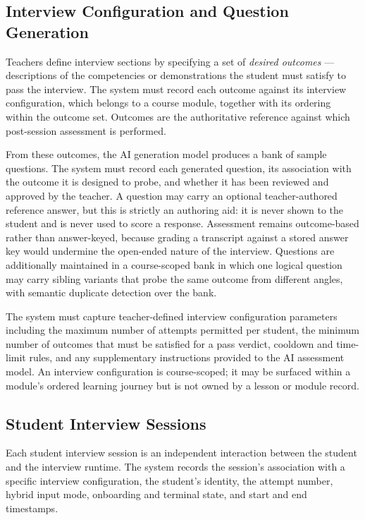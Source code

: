 \subsection{Interview Configuration and Question Generation}
Teachers define interview sections by specifying a set of 
\textit{desired outcomes} — descriptions of the competencies or 
demonstrations the student must satisfy to pass the interview. The 
system must record each outcome against its interview configuration,
which belongs to a course module, together with its ordering within the
outcome set. Outcomes are the authoritative reference against which
post-session assessment is performed.

From these outcomes, the AI generation model produces a bank of sample 
questions. The system must record each generated question, its 
association with the outcome it is designed to probe, and whether it 
has been reviewed and approved by the teacher. A question may carry an
optional teacher-authored reference answer, but this is strictly an
authoring aid: it is never shown to the student and is never used to
score a response. Assessment remains outcome-based rather than
answer-keyed, because grading a transcript against a stored answer key
would undermine the open-ended nature of the interview. Questions are
additionally maintained in a course-scoped bank in which one logical
question may carry sibling variants that probe the same outcome from
different angles, with semantic duplicate detection over the bank.

The system must capture teacher-defined interview configuration
parameters including the maximum number of attempts permitted per
student, the minimum number of outcomes that must be satisfied for a
pass verdict, cooldown and time-limit rules, and any supplementary
instructions provided to the AI assessment model. An interview configuration is course-scoped; it may be surfaced within a module's ordered learning journey but is not owned by a lesson or module record.

\subsection{Student Interview Sessions}
Each student interview session is an independent interaction between
the student and the interview runtime. The system records the session's
association with a specific interview configuration, the student's
identity, the attempt number, hybrid input mode, onboarding and terminal
state, and start and end timestamps.

